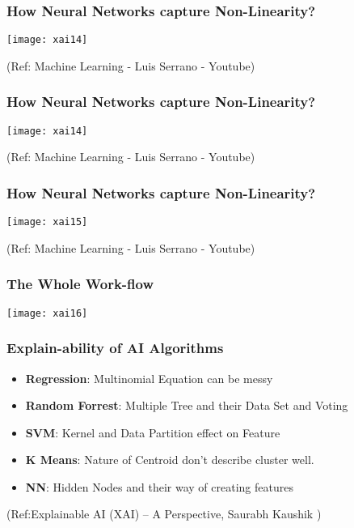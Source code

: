 \begin{frame}[fragile]\frametitle{How Neural Networks capture Non-Linearity?}
\begin{center}
\texttt{[image: xai14]}
\end{center}

\tiny{(Ref: Machine Learning - Luis Serrano - Youtube)}
\end{frame}

\begin{frame}[fragile]\frametitle{How Neural Networks capture Non-Linearity?}
\begin{center}
\texttt{[image: xai14]}
\end{center}

\tiny{(Ref: Machine Learning - Luis Serrano - Youtube)}
\end{frame}

\begin{frame}[fragile]\frametitle{How Neural Networks capture Non-Linearity?}
\begin{center}
\texttt{[image: xai15]}
\end{center}

\tiny{(Ref: Machine Learning - Luis Serrano - Youtube)}
\end{frame}

\begin{frame}[fragile]\frametitle{The Whole Work-flow}
\begin{center}
\texttt{[image: xai16]}
\end{center}

\end{frame}

\begin{frame}[fragile]\frametitle{Explain-ability of AI Algorithms}
\begin{itemize}
\item {\bf Regression}: Multinomial Equation can be messy 
\item {\bf Random Forrest}: Multiple Tree and their Data Set and Voting 
\item {\bf SVM}: Kernel and Data Partition effect on Feature 
\item {\bf K Means}: Nature of Centroid don't describe cluster well. 
\item {\bf NN}: Hidden Nodes and their way of creating features 
\end{itemize}

\tiny{(Ref:Explainable AI (XAI) – A Perspective, Saurabh Kaushik  )}

\end{frame}

